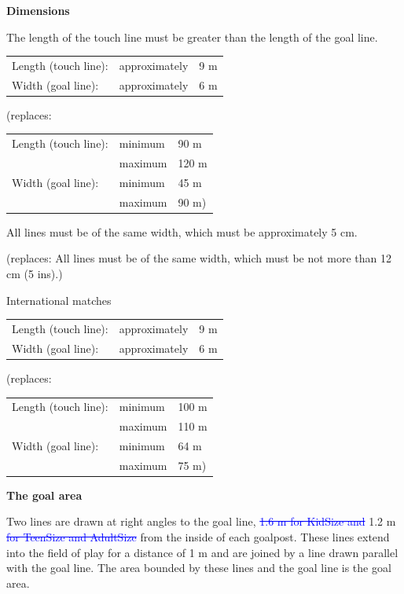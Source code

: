 \bigskip

{\textbf{Dimensions}}

\headlinebox

The length of the touch line must be greater than the length of the goal line. 

\bigskip

\begin{tabular}{lll}
Length (touch line): &approximately &9 m \\
Width (goal line): &approximately &6 m
\end{tabular}

{\color[rgb]{0.4,0.4,0.4}
(replaces:

\begin{tabular}{lll}
Length (touch line): &minimum &90 m \\
&maximum &120 m \\
Width (goal line): &minimum &45 m \\
&maximum &90 m)
\end{tabular}
}

\bigskip

All lines must be of the same width, which must be approximately 5 cm. 

{\color[rgb]{0.4,0.4,0.4}
(replaces: All lines must be of the same width, which must be not more than 12 cm (5 ins).)}


\bigskip

International matches 

\begin{tabular}{lll}
Length (touch line): &approximately &9 m \\
Width (goal line): &approximately &6 m
\end{tabular}

{\color[rgb]{0.4,0.4,0.4}
(replaces: 

\begin{tabular}{lll}
Length (touch line): &minimum &100 m \\
&maximum &110 m \\
Width (goal line): &minimum &64 m \\
&maximum &75 m)
\end{tabular}
}

\bigskip

{\bfseries The goal area }

\headlinebox

Two lines are drawn at right angles to the goal line, \textcolor{blue}{\sout{1.6 m for KidSize and}} 1.2 m \textcolor{blue}{\sout{for TeenSize and AdultSize}} from the inside of each goalpost. These lines extend into the field of play for a distance of 1 m and are joined by a line drawn parallel with the goal line. The area bounded by these lines and the goal line is the goal area. 

